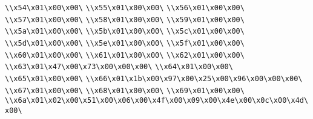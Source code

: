 \verb|\\x54\x01\x00\x00\|\newline
\verb|\\x55\x01\x00\x00\|\newline
\verb|\\x56\x01\x00\x00\|\newline
\verb|\\x57\x01\x00\x00\|\newline
\verb|\\x58\x01\x00\x00\|\newline
\verb|\\x59\x01\x00\x00\|\newline
\verb|\\x5a\x01\x00\x00\|\newline
\verb|\\x5b\x01\x00\x00\|\newline
\verb|\\x5c\x01\x00\x00\|\newline
\verb|\\x5d\x01\x00\x00\|\newline
\verb|\\x5e\x01\x00\x00\|\newline
\verb|\\x5f\x01\x00\x00\|\newline
\verb|\\x60\x01\x00\x00\|\newline
\verb|\\x61\x01\x00\x00\|\newline
\verb|\\x62\x01\x00\x00\|\newline
\verb|\\x63\x01\x47\x00\x73\x00\x00\x00\|\newline
\verb|\\x64\x01\x00\x00\|\newline
\verb|\\x65\x01\x00\x00\|\newline
\verb|\\x66\x01\x1b\x00\x97\x00\x25\x00\x96\x00\x00\x00\|\newline
\verb|\\x67\x01\x00\x00\|\newline
\verb|\\x68\x01\x00\x00\|\newline
\verb|\\x69\x01\x00\x00\|\newline
\verb|\\x6a\x01\x02\x00\x51\x00\x06\x00\x4f\x00\x09\x00\x4e\x00\x0c\x00\x4d\x00\|\newline
